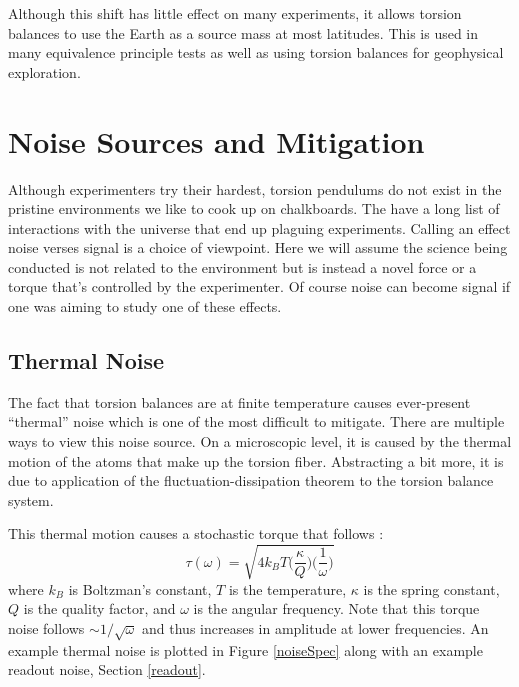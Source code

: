 \documentclass{book}
\begin{document}
Although this shift has little effect on many experiments, it allows torsion balances to use the Earth as a source mass at most latitudes. This is used in many equivalence principle tests as well as using torsion balances for geophysical exploration.




\chapter{Noise Sources and Mitigation}

\quad Although experimenters try their hardest, torsion pendulums do not exist in the pristine environments we like to cook up on chalkboards. The have a long list of interactions with the universe that end up plaguing experiments. Calling an effect noise verses signal is a choice of viewpoint. Here we will assume the science being conducted is not related to the environment but is instead a novel force or a torque that's controlled by the experimenter. Of course noise can become signal if one was aiming to study one of these effects.

\section{Thermal Noise} \label{thermal}

\quad The fact that torsion balances are at finite temperature causes ever-present ``thermal'' noise which is one of the most difficult to mitigate. There are multiple ways to view this noise source. On a microscopic level, it is caused by the thermal motion of the atoms that make up the torsion fiber. Abstracting a bit more, it is due to application of the fluctuation-dissipation theorem \cite{flucDis} to the torsion balance system.

This thermal motion causes a stochastic torque that follows \cite{thermal}:
\begin{equation}
\tau (\omega)= \sqrt{4 k_B T\bigg( \frac{\kappa}{Q} \bigg) \bigg( \frac{1}{\omega} \bigg)}\label{thermEq}
\end{equation}
where $k_B$ is Boltzman's constant, $T$ is the temperature, $\kappa$ is the spring constant, $Q$ is the quality factor, and $\omega$ is the angular frequency. Note that this torque noise follows $\sim 1/\sqrt{\omega}$ and thus increases in amplitude at lower frequencies. An example thermal noise is plotted in Figure \ref{noiseSpec} along with an example readout noise, Section \ref{readout}.
\end{document}
